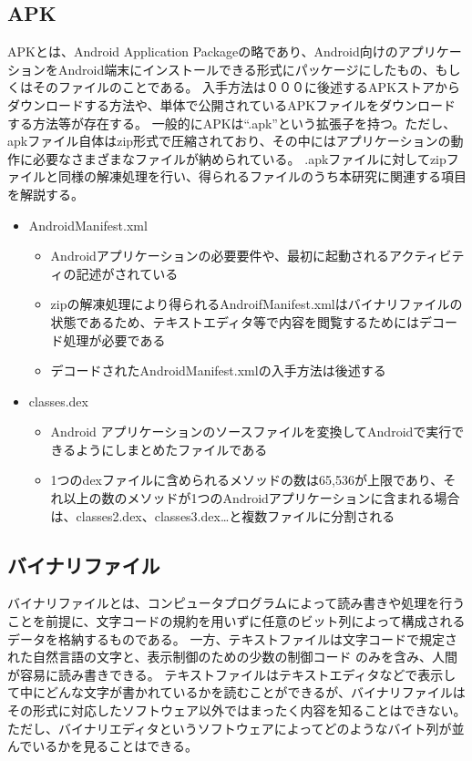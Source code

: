 \subsection{APK}
APKとは、Android Application Packageの略であり、Android向けのアプリケーションをAndroid端末にインストールできる形式にパッケージにしたもの、もしくはそのファイルのことである。
入手方法は０００に後述するAPKストアからダウンロードする方法や、単体で公開されているAPKファイルをダウンロードする方法等が存在する。
一般的にAPKは“.apk”という拡張子を持つ。ただし、apkファイル自体はzip形式で圧縮されており、その中にはアプリケーションの動作に必要なさまざまなファイルが納められている。
.apkファイルに対してzipファイルと同様の解凍処理を行い、得られるファイルのうち本研究に関連する項目を解説する。
\begin{itemize}
	\item  AndroidManifest.xml
		\begin{itemize}
			\item Androidアプリケーションの必要要件や、最初に起動されるアクティビティの記述がされている
			\item zipの解凍処理により得られるAndroifManifest.xmlはバイナリファイルの状態であるため、テキストエディタ等で内容を閲覧するためにはデコード処理が必要である
			\item デコードされたAndroidManifest.xmlの入手方法は後述する
		\end{itemize}
	\item classes.dex
		\begin{itemize}
			\item Android アプリケーションのソースファイルを変換してAndroidで実行できるようにしまとめたファイルである
			\item 1つのdexファイルに含められるメソッドの数は65,536が上限であり、それ以上の数のメソッドが1つのAndroidアプリケーションに含まれる場合は、classes2.dex、classes3.dex…と複数ファイルに分割される
		\end{itemize}
\end{itemize}


\subsection{バイナリファイル}
バイナリファイルとは、コンピュータプログラムによって読み書きや処理を行うことを前提に、文字コードの規約を用いずに任意のビット列によって構成されるデータを格納するものである。
一方、テキストファイルは文字コードで規定された自然言語の文字と、表示制御のための少数の制御コード
のみを含み、人間が容易に読み書きできる。
テキストファイルはテキストエディタなどで表示して中にどんな文字が書かれているかを読むことができるが、バイナリファイルはその形式に対応したソフトウェア以外ではまったく内容を知ることはできない。
ただし、バイナリエディタというソフトウェアによってどのようなバイト列が並んでいるかを見ることはできる。


